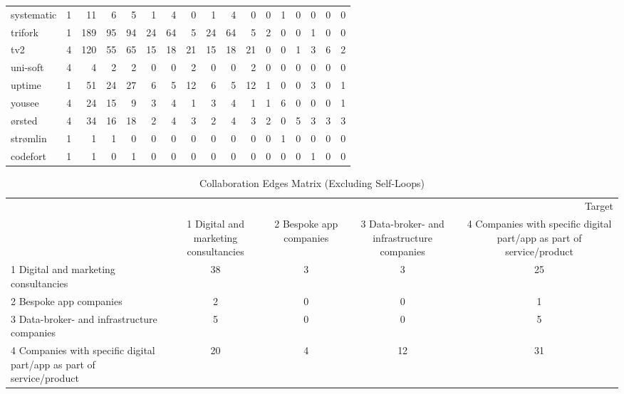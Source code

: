 \begin{table}
\begin{tabular}{lrrrrrrrrrrrrrrrr}
systematic & 1 & 11 & 6 & 5 & 1 & 4 & 0 & 1 & 4 & 0 & 0 & 1 & 0 & 0 & 0 & 0 \\
trifork & 1 & 189 & 95 & 94 & 24 & 64 & 5 & 24 & 64 & 5 & 2 & 0 & 0 & 1 & 0 & 0 \\
tv2 & 4 & 120 & 55 & 65 & 15 & 18 & 21 & 15 & 18 & 21 & 0 & 0 & 1 & 3 & 6 & 2 \\
uni-soft & 4 & 4 & 2 & 2 & 0 & 0 & 2 & 0 & 0 & 2 & 0 & 0 & 0 & 0 & 0 & 0 \\
uptime & 1 & 51 & 24 & 27 & 6 & 5 & 12 & 6 & 5 & 12 & 1 & 0 & 0 & 3 & 0 & 1 \\
yousee & 4 & 24 & 15 & 9 & 3 & 4 & 1 & 3 & 4 & 1 & 1 & 6 & 0 & 0 & 0 & 1 \\
ørsted & 4 & 34 & 16 & 18 & 2 & 4 & 3 & 2 & 4 & 3 & 2 & 0 & 5 & 3 & 3 & 3 \\
strømlin & 1 & 1 & 1 & 0 & 0 & 0 & 0 & 0 & 0 & 0 & 0 & 1 & 0 & 0 & 0 & 0 \\
codefort & 1 & 1 & 0 & 1 & 0 & 0 & 0 & 0 & 0 & 0 & 0 & 0 & 0 & 1 & 0 & 0 \\
\bottomrule
\end{tabular}

\end{table}

\newpage
\small
\begin{table}
\centering
\caption{Collaboration Edges Matrix (Excluding Self-Loops)}
\label{tab:collaboration_matrix}
\begin{tabular}{lcccc}
\toprule
 & \multicolumn{4}{r}{Target} \\
 & 1 Digital and marketing consultancies & 2 Bespoke app companies & 3 Data-broker- and infrastructure companies & 4 Companies with specific digital part/app as part of service/product \\
\midrule
1 Digital and marketing consultancies & 38 & 3 & 3 & 25 \\
2 Bespoke app companies & 2 & 0 & 0 & 1 \\
3 Data-broker- and infrastructure companies & 5 & 0 & 0 & 5 \\
4 Companies with specific digital part/app as part of service/product & 20 & 4 & 12 & 31 \\
\bottomrule
\end{tabular}
\end{table}

